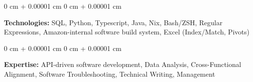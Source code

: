 \documentclass[10pt, letterpaper]{article}
\newenvironment{onecolentry}{
    \begin{adjustwidth}{
        0 cm + 0.00001 cm
    }{
        0 cm + 0.00001 cm
    }
}{
    \end{adjustwidth}
} %
\begin{document}
        
        \begin{onecolentry}
            \textbf{Technologies:} SQL, Python, Typescript, Java, Nix, Bash/ZSH, Regular Expressions, Amazon-internal software build system, Excel (Index/Match, Pivots)
        \end{onecolentry}

        \vspace{0.2 cm}

        \begin{onecolentry}
            \textbf{Expertise:} API-driven software development, Data Analysis, Cross-Functional Alignment, Software Troubleshooting, Technical Writing, Management
        \end{onecolentry}


    
\end{document}
